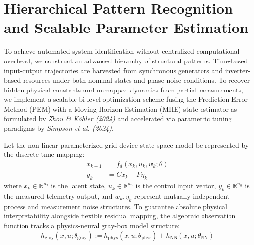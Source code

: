 \documentclass[11pt,fleqn]{article}
\begin{document}
\section{Hierarchical Pattern Recognition and Scalable Parameter Estimation}
To achieve automated system identification without centralized computational overhead, we construct an advanced hierarchy of structural patterns. Time-based input-output trajectories are harvested from synchronous generators and inverter-based resources under both nominal states and phase noise conditions. To recover hidden physical constants and unmapped dynamics from partial measurements, we implement a scalable bi-level optimization scheme fusing the Prediction Error Method (PEM) with a Moving Horizon Estimation (MHE) state estimator as formulated by \textit{Zhou \& Köhler (2024)} and accelerated via parametric tuning paradigms by \textit{Simpson et al. (2024)}.

Let the non-linear parameterized grid device state space model be represented by the discrete-time mapping:
\begin{align}
x_{k+1} &= f_d(x_k, u_k, w_k; \theta) \\
y_k &= C x_k + F \eta_k
\end{align}
where $x_k \in \mathbb{R}^{n_x}$ is the latent state, $u_k \in \mathbb{R}^{n_u}$ is the control input vector, $y_k \in \mathbb{R}^{n_y}$ is the measured telemetry output, and $w_k, \eta_k$ represent mutually independent process and measurement noise structures. To guarantee absolute physical interpretability alongside flexible residual mapping, the algebraic observation function tracks a physics-neural gray-box model structure:
\begin{equation}
h_{\text{gray}}(x, u; \theta_{\text{gray}}) := h_{\text{phys}}(x, u; \theta_{\text{phys}}) + h_{\text{NN}}(x, u; \theta_{\text{NN}})
\end{equation}
\end{document}
